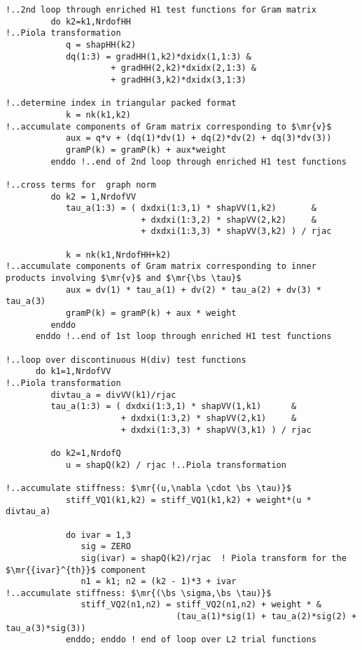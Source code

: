 \begin{lstlisting}[mathescape,caption=\file{POISSON/ULTRAWEAK\_DPG/}\routine{elem}: element integration]
!..2nd loop through enriched H1 test functions for Gram matrix
         do k2=k1,NrdofHH
!..Piola transformation
            q = shapHH(k2)
            dq(1:3) = gradHH(1,k2)*dxidx(1,1:3) &
                     + gradHH(2,k2)*dxidx(2,1:3) &
                     + gradHH(3,k2)*dxidx(3,1:3)

!..determine index in triangular packed format            
            k = nk(k1,k2)
!..accumulate components of Gram matrix corresponding to $\mr{v}$
            aux = q*v + (dq(1)*dv(1) + dq(2)*dv(2) + dq(3)*dv(3))
            gramP(k) = gramP(k) + aux*weight
         enddo !..end of 2nd loop through enriched H1 test functions

!..cross terms for  graph norm
         do k2 = 1,NrdofVV
            tau_a(1:3) = ( dxdxi(1:3,1) * shapVV(1,k2)       &
                           + dxdxi(1:3,2) * shapVV(2,k2)     &
                           + dxdxi(1:3,3) * shapVV(3,k2) ) / rjac

            k = nk(k1,NrdofHH+k2)
!..accumulate components of Gram matrix corresponding to inner products involving $\mr{v}$ and $\mr{\bs \tau}$
            aux = dv(1) * tau_a(1) + dv(2) * tau_a(2) + dv(3) * tau_a(3)
            gramP(k) = gramP(k) + aux * weight
         enddo
      enddo !..end of 1st loop through enriched H1 test functions

!..loop over discontinuous H(div) test functions
      do k1=1,NrdofVV
!..Piola transformation
         divtau_a = divVV(k1)/rjac
         tau_a(1:3) = ( dxdxi(1:3,1) * shapVV(1,k1)      &
                       + dxdxi(1:3,2) * shapVV(2,k1)     &
                       + dxdxi(1:3,3) * shapVV(3,k1) ) / rjac
         
         do k2=1,NrdofQ
            u = shapQ(k2) / rjac !..Piola transformation

!..accumulate stiffness: $\mr{(u,\nabla \cdot \bs \tau)}$
            stiff_VQ1(k1,k2) = stiff_VQ1(k1,k2) + weight*(u * divtau_a)

            do ivar = 1,3
               sig = ZERO
               sig(ivar) = shapQ(k2)/rjac  ! Piola transform for the $\mr{{ivar}^{th}}$ component
               n1 = k1; n2 = (k2 - 1)*3 + ivar
!..accumulate stiffness: $\mr{(\bs \sigma,\bs \tau)}$
               stiff_VQ2(n1,n2) = stiff_VQ2(n1,n2) + weight * & 
                                  (tau_a(1)*sig(1) + tau_a(2)*sig(2) + tau_a(3)*sig(3))
            enddo; enddo ! end of loop over L2 trial functions


\end{lstlisting}
